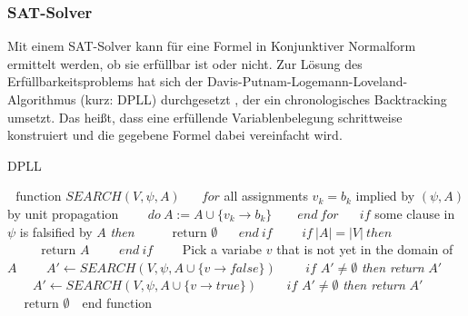 \documentclass[a4,abstract=on]{scrartcl}
\begin{document}
\subsubsection{SAT-Solver}
Mit einem SAT-Solver kann für eine Formel in Konjunktiver Normalform ermittelt werden, ob sie erfüllbar ist oder nicht. Zur Lösung des Erfüllbarkeitsproblems hat sich der Davis-Putnam-Logemann-Loveland-Algorithmus (kurz: DPLL) durchgesetzt \cite[vgl.][]{dpll}, der ein chronologisches Backtracking umsetzt. Das heißt, dass eine erfüllende Variablenbelegung schrittweise konstruiert und die gegebene Formel dabei vereinfacht wird. 
\FloatBarrier
\begin{algorithm}[h]
\caption{DPLL}
\label{alg:dpll}
\begin{algorithmic}

\State $\text{~~function~}SEARCH(V,\psi,A) $
\State $\text{~~~~}for$ all assignments $v_k=b_k$ implied by $(\psi, A)$ by unit propagation 
\State $\text{~~~~~~}do {~}A:=A\cup\{v_k \rightarrow b_k\}$
\State $\text{~~~~ }end {~} for$
\State $\text{~~~~}if $ some clause in $\psi$ is falsified by $A$ \textit{then}
\State $\text{~~~~~~~~return } \emptyset$
\State $\text{~~~~}end {~} if$
\State $\text{~~~~~~}if {~} |A| = |V| {~} then$
\State $\text{~~~~~~~~return } A$
\State $\text{~~~~~~} end {~} if$
\State $\text{~~~~~~}$Pick a variabe $v$ that is not yet in the domain of $A$
\State $\text{~~~~~~} A' \leftarrow SEARCH(V,\psi,A\cup\{v \rightarrow false\})$
\State $\text{~~~~~~}if$ $A' \neq \emptyset$ \textit{then return} $A'$
\State $\text{~~~~~~}A' \leftarrow SEARCH(V,\psi, A \cup \{v \rightarrow true\})$
\State $\text{~~~~~~}if$ $A' \neq \emptyset$ \textit{then return} $A'$
\State $\text{~~~~return }\emptyset$
\State $\text{~~}$end function
\end{algorithmic}
\end{algorithm}
\FloatBarrier
\end{document}

